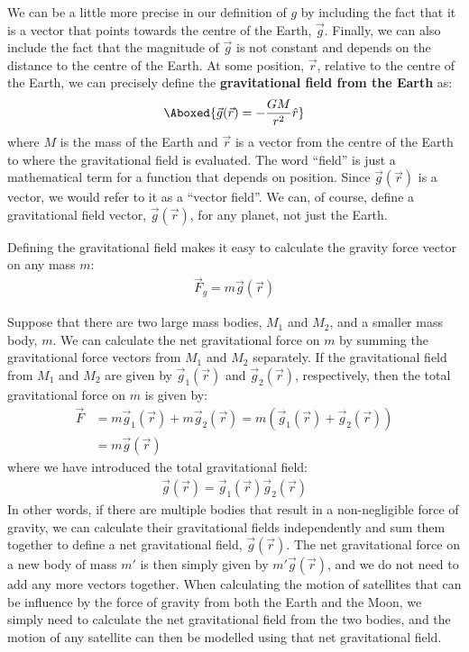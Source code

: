 We can be a little more precise in our definition of $g$ by including the fact that it is a vector that points towards the centre of the Earth, $\vec g$. Finally, we can also include the fact that the magnitude of $\vec g$ is not constant and depends on the distance to the centre of the Earth. At some position, $\vec r$, relative to the centre of the Earth, we can precisely define the \textbf{gravitational field from the Earth} as:
\begin{align}
\Aboxed{\vec g(\vec r) = - \frac{GM}{r^2}\hat r}
\end{align}
where $M$ is the mass of the Earth and $\vec r$ is a vector from the centre of the Earth to where the gravitational field is evaluated. The word ``field'' is just a mathematical term for a function that depends on position. Since $\vec g(\vec r)$ is a vector, we would refer to it as a ``vector field''. We can, of course, define a gravitational field vector, $\vec g(\vec r)$, for any planet, not just the Earth. 

Defining the gravitational field makes it easy to calculate the gravity force vector on any mass $m$:
\begin{align*}
\vec F_g = m\vec g(\vec r)
\end{align*}

Suppose that there are two large mass bodies, $M_1$ and $M_2$, and a smaller mass body, $m$. We can calculate the net gravitational force on $m$ by summing the gravitational force vectors from $M_1$ and $M_2$ separately. If the gravitational field from $M_1$ and $M_2$ are given by $\vec g_1(\vec r)$ and $\vec g_2(\vec r)$, respectively, then the total gravitational force on $m$ is given by:
\begin{align*}
\vec F &= m\vec g_1(\vec r) + m\vec g_2(\vec r)=m(\vec g_1(\vec r)+\vec g_2(\vec r))\\
&=m \vec g(\vec r)
\end{align*}
where we have introduced the total gravitational field:
\begin{align*}
\vec g(\vec r) = \vec g_1(\vec r)\vec g_2(\vec r)
\end{align*}
In other words, if there are multiple bodies that result in a non-negligible force of gravity, we can calculate their gravitational fields independently and sum them together to define a net gravitational field, $\vec g(\vec r)$. The net gravitational force on a new body of mass $m'$ is then simply given by $m'\vec g(\vec r)$, and we do not need to add any more vectors together. When calculating the motion of satellites that can be influence by the force of gravity from both the Earth and the Moon, we simply need to calculate the net gravitational field from the two bodies, and the motion of any satellite can then be modelled using that net gravitational field.

